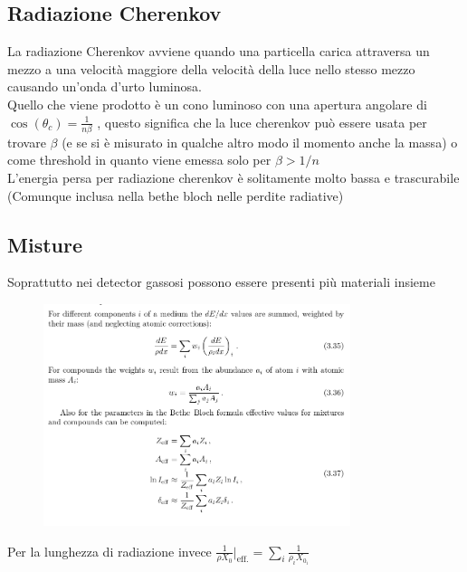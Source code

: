 \subsection*{Radiazione Cherenkov}
La radiazione Cherenkov avviene quando una particella carica attraversa un mezzo a una velocità maggiore della velocità della luce nello stesso mezzo causando un'onda d'urto luminosa.
\\
Quello che viene prodotto è un cono luminoso con una apertura angolare di $\cos(\theta_c)=\frac{1}{n\beta}$ , questo significa che la luce cherenkov può essere usata per trovare $\beta$ (e se si è misurato in qualche altro modo il momento anche la massa) o come threshold in quanto viene emessa solo per $\beta>1/n$
\\
L'energia persa per radiazione cherenkov è solitamente molto bassa e trascurabile (Comunque inclusa nella bethe bloch nelle perdite radiative)
\subsection*{Misture}
Soprattutto nei detector gassosi possono essere presenti più materiali insieme
\begin{figure}[H]
    \centering
    \includegraphics[width=0.8\textwidth,frame]{Chapters/images/Interazione_radiazione_materia/image-20220217042603821.png}
    \captionsetup{width=0.8\linewidth}
    \label{fig:misture}
\end{figure}
Per la lunghezza di radiazione invece $\frac{1}{\rho X_0}|_{\text{eff.}}=\sum_i \frac{1}{\rho_i X_{0_i}}$
